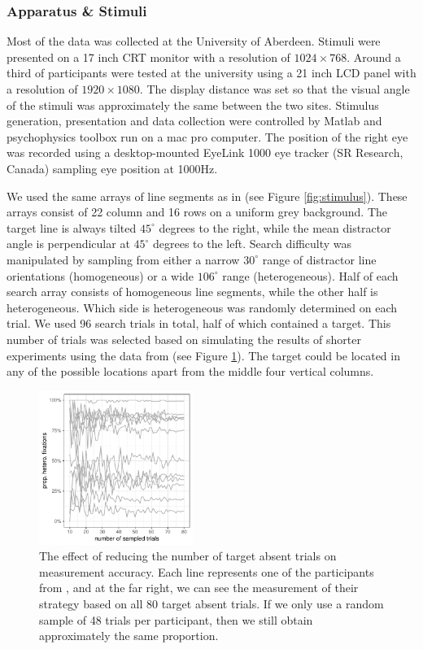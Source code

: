 \documentclass[]{rsos}
\begin{document}
\subsubsection{Apparatus \& Stimuli}

Most of the data was collected at the University of Aberdeen. Stimuli were presented on a 17 inch CRT monitor with a resolution of $1024 \times 768$. Around a third of participants were tested at the university using a 21 inch LCD panel with a resolution of $1920 \times 1080$. The display distance was set so that the visual angle of the stimuli was approximately the same between the two sites. Stimulus generation, presentation and data collection were controlled by Matlab and psychophysics toolbox \cite{brainard1997,cornelissen2002} run on a mac pro computer. The position of the right eye was recorded using a desktop-mounted EyeLink 1000 eye tracker (SR Research, Canada) sampling eye position at 1000Hz. 

We used the same arrays of line segments as in \cite{nowakowska2017} (see Figure \ref{fig:stimulus}). These arrays consist of 22 column and 16 rows on a uniform grey background. The target line is always tilted $45^{\circ}$ degrees to the right, while the mean distractor angle is perpendicular at $45^{\circ}$ degrees to the left. Search difficulty was manipulated by sampling from either a narrow $30^{\circ}$ range of distractor line orientations (homogeneous) or a wide $106^{\circ}$ range (heterogeneous). Half of each search array consists of homogeneous line segments, while the other half is heterogeneous. Which side is heterogeneous was randomly determined on each trial. We used 96 search trials in total, half of which contained a target. This number of trials was selected based on simulating the results of shorter experiments using the data from \cite{nowakowska2017} (see Figure \ref{fig:num_trials}). The target could be located in any of the possible locations apart from the middle four vertical columns.

\begin{figure}
\centering
 \includegraphics[width=5cm]{Figures/using_smaller_sample_sizes.pdf}
\caption{The effect of reducing the number of target absent trials on measurement accuracy. Each line represents one of the participants from \cite{nowakowska2017}, and at the far right, we can see the measurement of their strategy based on all 80 target absent trials. If we only use a random sample of 48 trials per participant, then we still obtain approximately the same proportion.}
\label{fig:num_trials}
\end{figure}
\end{document}
